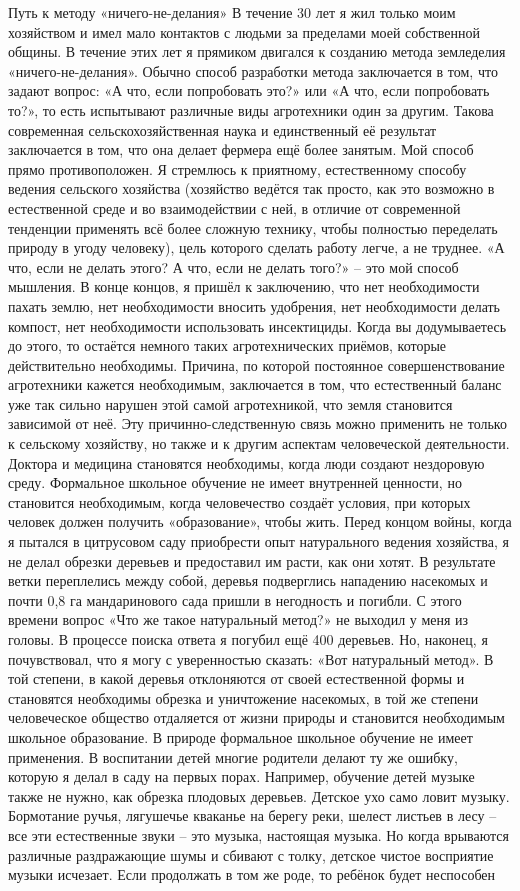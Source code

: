 \documentclass[a4paper]{book}
\begin{document}
Путь к методу «ничего-не-делания»
В течение 30 лет я жил только моим хозяйством и имел мало контактов с людьми за
пределами моей собственной общины. В течение этих лет я прямиком двигался к созданию
метода земледелия «ничего-не-делания».
Обычно способ разработки метода заключается в том, что задают вопрос: «А что, если
попробовать это?» или «А что, если попробовать то?», то есть испытывают различные виды
агротехники один за другим. Такова современная сельскохозяйственная наука и
единственный её результат заключается в том, что она делает фермера ещё более занятым.
Мой способ прямо противоположен. Я стремлюсь к приятному, естественному способу
ведения сельского хозяйства (хозяйство ведётся так просто, как это возможно в естественной
среде и во взаимодействии с ней, в отличие от современной тенденции применять всё более
сложную технику, чтобы полностью переделать природу в угоду человеку), цель которого
сделать работу легче, а не труднее. «А что, если не делать этого? А что, если не делать
того?» – это мой способ мышления. В конце концов, я пришёл к заключению, что нет
необходимости пахать землю, нет необходимости вносить удобрения, нет необходимости
делать компост, нет необходимости использовать инсектициды. Когда вы додумываетесь до
этого, то остаётся немного таких агротехнических приёмов, которые действительно
необходимы.
Причина, по которой постоянное совершенствование агротехники кажется
необходимым, заключается в том, что естественный баланс уже так сильно нарушен этой
самой агротехникой, что земля становится зависимой от неё.
Эту причинно-следственную связь можно применить не только к сельскому хозяйству,
но также и к другим аспектам человеческой деятельности. Доктора и медицина становятся
необходимы, когда люди создают нездоровую среду. Формальное школьное обучение не
имеет внутренней ценности, но становится необходимым, когда человечество создаёт
условия, при которых человек должен получить «образование», чтобы жить.
Перед концом войны, когда я пытался в цитрусовом саду приобрести опыт натурального
ведения хозяйства, я не делал обрезки деревьев и предоставил им расти, как они хотят. В
результате ветки переплелись между собой, деревья подверглись нападению насекомых и
почти 0,8 га мандаринового сада пришли в негодность и погибли. С этого времени вопрос
«Что же такое натуральный метод?» не выходил у меня из головы. В процессе поиска ответа
я погубил ещё 400 деревьев. Но, наконец, я почувствовал, что я могу с уверенностью сказать:
«Вот натуральный метод».
В той степени, в какой деревья отклоняются от своей естественной формы и становятся
необходимы обрезка и уничтожение насекомых, в той же степени человеческое общество
отдаляется от жизни природы и становится необходимым школьное образование. В природе
формальное школьное обучение не имеет применения.
В воспитании детей многие родители делают ту же ошибку, которую я делал в саду на
первых порах. Например, обучение детей музыке также не нужно, как обрезка плодовых
деревьев. Детское ухо само ловит музыку. Бормотание ручья, лягушечье кваканье на берегу
реки, шелест листьев в лесу – все эти естественные звуки – это музыка, настоящая музыка.
Но когда врываются различные раздражающие шумы и сбивают с толку, детское чистое
восприятие музыки исчезает. Если продолжать в том же роде, то ребёнок будет неспособен
\end{document}
